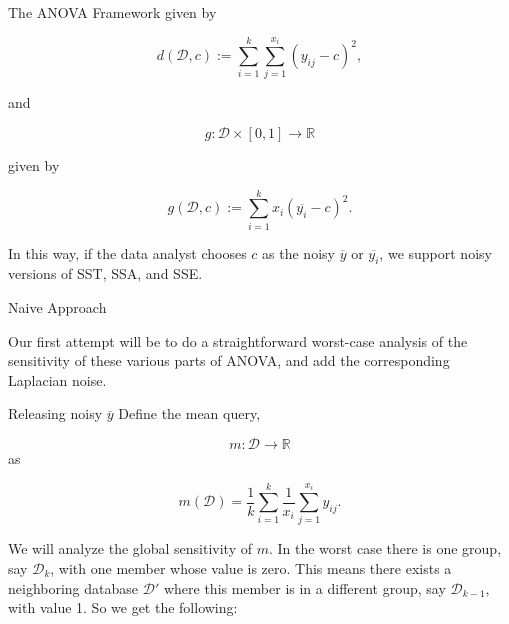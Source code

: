 \documentclass[11pt]{article}
\begin{document}
\begin{section}{The ANOVA Framework}
given by

\[
d(\mathcal{D},c) := \sum_{i=1}^k \sum_{j=1}^{x_i} (y_{ij} - c)^2,
\]

and 

\[
g:\mathcal{D}\times [0,1]\to\mathbb{R}
\]

given by

\[
g(\mathcal{D},c) := \sum_{i=1}^k x_i (\overline{y_i} - c)^2.
\]

In this way, if the data analyst chooses $c$ as the noisy $\overline{y}$ or 
$\overline{y_i}$, we support noisy versions of SST, SSA, and SSE.

\end{section}

\begin{section}{Naive Approach}

Our first attempt will be to do a straightforward worst-case analysis of 
the sensitivity of these various parts of ANOVA, and add the corresponding 
Laplacian noise. 

\begin{subsection}{Releasing noisy $\overline{y}$}
Define the mean query,

\[
m:\mathcal{D}\to\mathbb{R}
\]
as 

\[
m(\mathcal{D}) = \frac{1}{k} \sum_{i=1}^k \frac{1}{x_i} 
  \sum_{j=1}^{x_i} y_{ij}.
\]

We will analyze the global sensitivity of $m$. In the worst 
case there is one group, say $\mathcal{D}_k$, with one member whose 
value is zero. This means there exists a neighboring database $\mathcal{D}'$ 
where this member is in a different group, say $\mathcal{D}_{k-1}$, with 
value 1. So we get the following:


\end{subsection}
\end{section}
\end{document}
